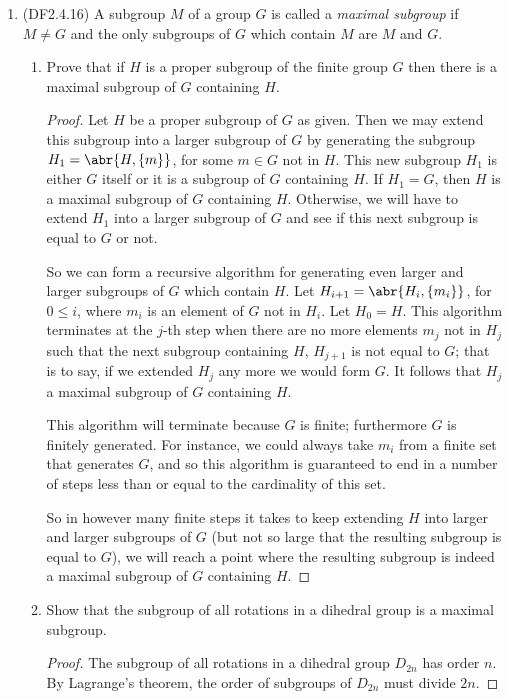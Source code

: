 \documentclass[11pt]{article}
\newcommand{\cbr}[1]{\left\{#1\right\}}
\begin{document}
\begin{enumerate}
\begin{enumerate}[label=(\alph*)]
\begin{proof}
        Hence $\mathbb{Q}$ is not finitely generated.
      \end{proof}
    \end{enumerate}
    \item (DF2.4.16) A subgroup $M$ of a group $G$ is called a \textit{maximal subgroup} if $M\neq G$ and the only subgroups of $G$ which contain $M$ are $M$ and $G$. \begin{enumerate}[label=(\alph*)]
      \item Prove that if $H$ is a proper subgroup of the finite group $G$ then there is a maximal subgroup of $G$ containing $H$. \begin{proof}
        Let $H$ be a proper subgroup of $G$ as given. Then we may extend this subgroup into a larger subgroup of $G$ by generating the subgroup $H_1 = \abr{H,\cbr{m}}$, for some $m\in G$ not in $H$. This new subgroup $H_1$ is either $G$ itself or it is a subgroup of $G$ containing $H$. If $H_1 = G$, then $H$ is a maximal subgroup of $G$ containing $H$. Otherwise, we will have to extend $H_1$ into a larger subgroup of $G$ and see if this next subgroup is equal to $G$ or not.
        
        So we can form a recursive algorithm for generating even larger and larger subgroups of $G$ which contain $H$. Let $H_{i+1} = \abr{H_i,\cbr{m_i}}$, for $0 \leq i$, where $m_i$ is an element of $G$ not in $H_i$. Let $H_0 = H$. This algorithm terminates at the $j$-th step when there are no more elements $m_j$ not in $H_j$ such that the next subgroup containing $H$, $H_{j+1}$ is not equal to $G$; that is to say, if we extended $H_j$ any more we would form $G$. It follows that $H_j$ a maximal subgroup of $G$ containing $H$.

        This algorithm will terminate because $G$ is finite; furthermore $G$ is finitely generated. For instance, we could always take $m_i$ from a finite set that generates $G$, and so this algorithm is guaranteed to end in a number of steps less than or equal to the cardinality of this set.

        So in however many finite steps it takes to keep extending $H$ into larger and larger subgroups of $G$ (but not so large that the resulting subgroup is equal to $G$), we will reach a point where the resulting subgroup is indeed a maximal subgroup of $G$ containing $H$.
      \end{proof}
      \item Show that the subgroup of all rotations in a dihedral group is a maximal subgroup. \begin{proof}
        The subgroup of all rotations in a dihedral group $D_{2n}$ has order $n$. By Lagrange's theorem, the order of subgroups of $D_{2n}$ must divide $2n$.


\end{proof}
\end{enumerate}
\end{enumerate}
\end{document}
